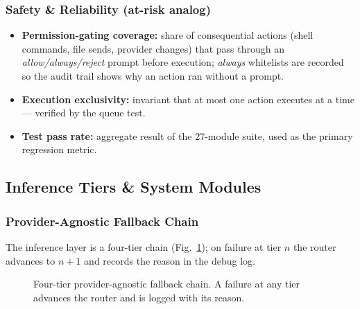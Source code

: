 \subsubsection{Safety \& Reliability (at-risk analog)}
\begin{itemize}
  \item \textbf{Permission-gating coverage:} share of
  consequential actions (shell commands, file sends, provider
  changes) that pass through an \emph{allow/always/reject}
  prompt before execution; \emph{always} whitelists are recorded
  so the audit trail shows why an action ran without a prompt.
  \item \textbf{Execution exclusivity:} invariant that at most
  one action executes at a time --- verified by the queue test.
  \item \textbf{Test pass rate:} aggregate result of the
  27-module suite, used as the primary regression metric.
\end{itemize}

\subsection{Inference Tiers \& System Modules}

\subsubsection{Provider-Agnostic Fallback Chain}

The inference layer is a four-tier chain
(Fig.~\ref{fig:chain}); on failure at tier $n$ the router
advances to $n{+}1$ and records the reason in the debug log.

\begin{figure}[t]
\centering
{}
\caption{Four-tier provider-agnostic fallback chain. A failure
at any tier advances the router and is logged with its
reason.}\label{fig:chain}
\end{figure}

